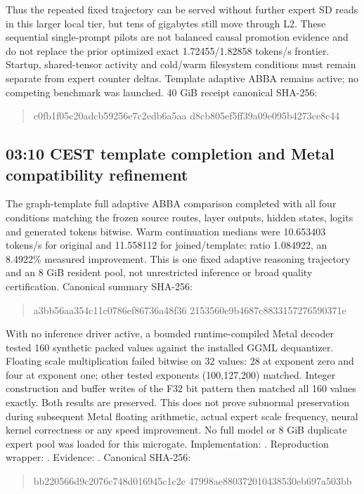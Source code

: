 Thus the repeated fixed trajectory can be served without further expert SD
reads in this larger local tier, but tens of gigabytes still move through L2.
These sequential single-prompt pilots are not balanced causal promotion
evidence and do not replace the prior optimized exact 1.72455/1.82858 tokens/s
frontier. Startup, shared-tensor activity and cold/warm filesystem conditions
must remain separate from expert counter deltas. Template adaptive ABBA remains
active; no competing benchmark was launched.
40 GiB receipt canonical SHA-256:
\begin{quote}\ttfamily\small
c0fb1f05c20adcb59256e7c2edb6a5aa\allowbreak
d8cb805ef5ff39a09e095b4273ce8c44
\end{quote}

\subsection{03:10 CEST template completion and Metal compatibility refinement}
The graph-template full adaptive ABBA comparison completed with all four
conditions matching the frozen source routes, layer outputs, hidden states,
logits and generated tokens bitwise. Warm continuation medians were
10.653403 tokens/s for original and 11.558112 for joined/template:
ratio 1.084922, an 8.4922\% measured improvement. This is one fixed adaptive
reasoning trajectory and an 8 GiB resident pool, not unrestricted inference
or broad quality certification. Canonical summary SHA-256:
\begin{quote}\ttfamily\small
a3bb56aa354c11c0786ef86736a48f36\allowbreak
2153560e9b4687c8833157276590371e
\end{quote}

With no inference driver active, a bounded runtime-compiled Metal decoder
tested 160 synthetic packed values against the installed GGML dequantizer.
Floating scale multiplication failed bitwise on 32 values: 28 at exponent
zero and four at exponent one; other tested exponents (100,127,200) matched.
Integer construction and buffer writes of the F32 bit pattern then matched
all 160 values exactly. Both results are preserved. This does not prove
subnormal preservation during subsequent Metal floating arithmetic, actual
expert scale frequency, neural kernel correctness or any speed improvement.
No full model or 8 GiB duplicate expert pool was loaded for this microgate.
Implementation: .
Reproduction wrapper: .
Evidence: .
Canonical SHA-256:
\begin{quote}\ttfamily\small
bb220566d9c2076c748d016945c1c2e\allowbreak
47998ae880372010438530eb697a503bb
\end{quote}


